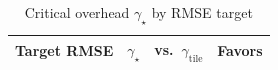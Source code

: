 \begin{table}[t]
\centering
\caption{Critical overhead $\gamma_\star$ by RMSE target}
\label{tab:gamma_star}
\footnotesize
\setlength{\tabcolsep}{3pt}
\begin{tabular}{lrrr}
\toprule
Target RMSE & $\gamma_\star$ & vs.\ $\gamma_{\mathrm{tile}}$ & Favors \\
\midrule
\bottomrule
\end{tabular}
\end{table}
